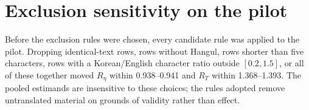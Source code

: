 \documentclass[11pt,a4paper]{article}
\newcommand{\RT}{R_{T}}
\newcommand{\Reta}{R_{\eta}}
\begin{document}
\section{Exclusion sensitivity on the pilot}

Before the exclusion rules were chosen, every candidate rule was applied to
the pilot. Dropping identical-text rows, rows without Hangul, rows shorter
than five characters, rows with a Korean/English character ratio outside
$[0.2,1.5]$, or all of these together moved $\Reta$ within 0.938--0.941 and
$\RT$ within 1.368--1.393. The pooled estimands are insensitive to these
choices; the rules adopted remove untranslated material on grounds of
validity rather than effect.
\end{document}
